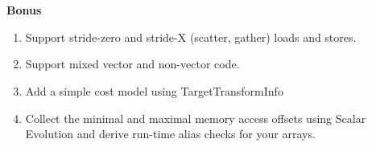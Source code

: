 \documentclass[12pt]{article}
\begin{document}
~\\
~\\

\textbf{Bonus}
\begin{enumerate}
	\item Support stride-zero and stride-X (scatter, gather) loads and
              stores.
	\item Support mixed vector and non-vector code.
	\item Add a simple cost model using TargetTransformInfo
	\item Collect the minimal and maximal memory access offsets using
              Scalar Evolution and derive run-time alias checks for your
              arrays.
\end{enumerate}
\end{document}
